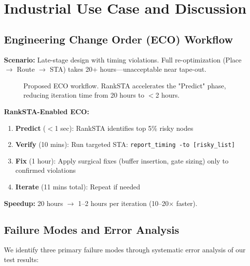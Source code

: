 \documentclass[10pt,twocolumn,journal]{IEEEtran}
\begin{document}
\section{Industrial Use Case and Discussion}
\label{sec:discussion}

\subsection{Engineering Change Order (ECO) Workflow}

\textbf{Scenario:} Late-stage design with timing violations. Full re-optimization (Place $\rightarrow$ Route $\rightarrow$ STA) takes 20+ hours---unacceptable near tape-out.

\begin{figure}[t]
\centering
{}
\caption{Proposed ECO workflow. RankSTA accelerates the "Predict" phase, reducing iteration time from 20 hours to $<$2 hours.}
\label{fig:eco_workflow}
\end{figure}

\textbf{RankSTA-Enabled ECO:}
\begin{enumerate}
    \item \textbf{Predict} ($<$1 sec): RankSTA identifies top 5\% risky nodes
    \item \textbf{Verify} (10 mins): Run targeted STA: \texttt{report\_timing -to [risky\_list]}
    \item \textbf{Fix} (1 hour): Apply surgical fixes (buffer insertion, gate sizing) only to confirmed violations
    \item \textbf{Iterate} (11 mins total): Repeat if needed
\end{enumerate}

\textbf{Speedup:} 20 hours $\rightarrow$ 1--2 hours per iteration (10--20$\times$ faster).

\subsection{Failure Modes and Error Analysis}

We identify three primary failure modes through systematic error analysis of our test results:
\end{document}
